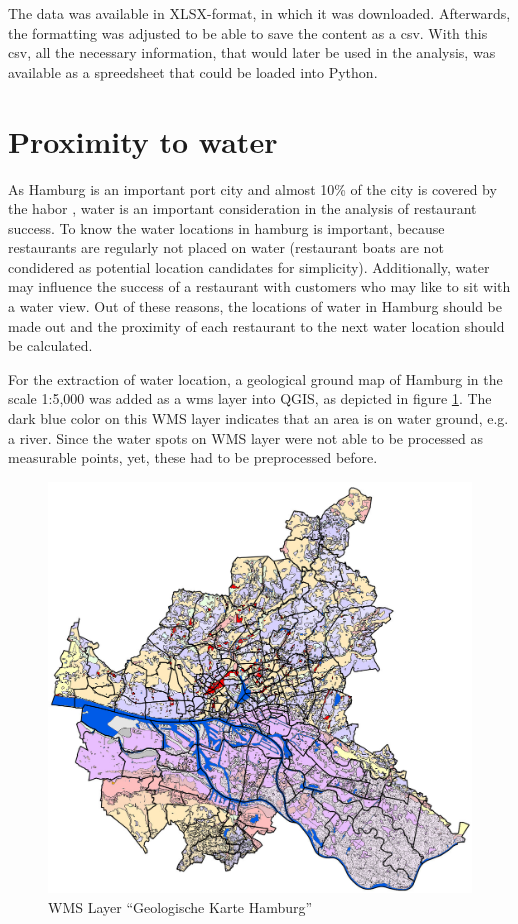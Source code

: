 \documentclass[a4paper, 11pt, oneside]{Thesis}  %
\begin{document}
The data was available in XLSX-format, in which it was downloaded. Afterwards, the formatting was adjusted to be able to save the content as a \ac{csv}. With this \ac{csv}, all the necessary information, that would later be used in the analysis, was available as a spreedsheet that could be loaded into Python.

\section{Proximity to water}
\label{proximity_to_water}

As Hamburg is an important port city and almost 10\% of the city is covered by the habor \cite{HamburgStadt2019}, water is an important consideration in the analysis of restaurant success. To know the water locations in hamburg is important, because restaurants are regularly not placed on water (restaurant boats are not condidered as potential location candidates for simplicity). Additionally, water may influence the success of a restaurant with customers who may like to sit with a water view. Out of these reasons, the locations of water in Hamburg should be made out and the proximity of each restaurant to the next water location should be calculated.

For the extraction of water location, a geological ground map of Hamburg in the scale 1:5,000 \cite{GeologischeKarte2019} was added as a \ac{wms} layer into QGIS, as depicted in figure \ref{fig:geologische_karte}. The dark blue color on this WMS layer indicates that an area is on water ground, e.g. a river. Since the water spots on WMS layer were not able to be processed as measurable points, yet, these had to be preprocessed before. 

\begin{figure}[h]
\includegraphics[scale=0.5]{Figures/WMS_Layer_Geologische_Karte.png}
\centering
\caption{WMS Layer ``Geologische Karte Hamburg''}
\label{fig:geologische_karte}
\end{figure}
\end{document}
